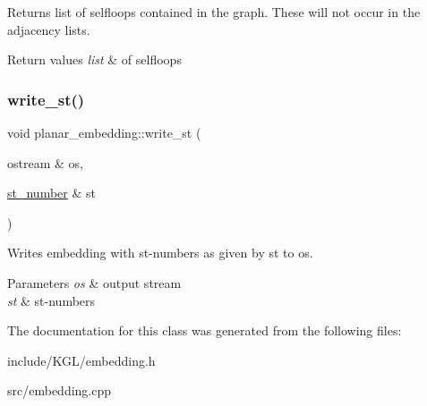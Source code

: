 Returns list of selfloops contained in the graph. These will not occur in the adjacency lists.


\begin{DoxyRetVals}{Return values}
{\em list} & of selfloops \\
\hline
\end{DoxyRetVals}
\mbox{\label{classplanar__embedding_ab2870ca51d0df44f8006ab69c3ee74d4}} 
\subsubsection{\texorpdfstring{write\+\_\+st()}{write\_st()}}
{\footnotesize\ttfamily void planar\+\_\+embedding\+::write\+\_\+st (\begin{DoxyParamCaption}\item[{ostream \&}]{os,  }\item[{\mbox{\hyperlink{classst__number}{st\+\_\+number}} \&}]{st }\end{DoxyParamCaption})}

Writes embedding with st-\/numbers as given by {\ttfamily st} to {\ttfamily os}.


\begin{DoxyParams}{Parameters}
{\em os} & output stream\\
\hline
{\em st} & st-\/numbers \\
\hline
\end{DoxyParams}


The documentation for this class was generated from the following files\+:\begin{DoxyCompactItemize}
\item 
include/\+K\+G\+L/embedding.\+h\item 
src/embedding.\+cpp\end{DoxyCompactItemize}
